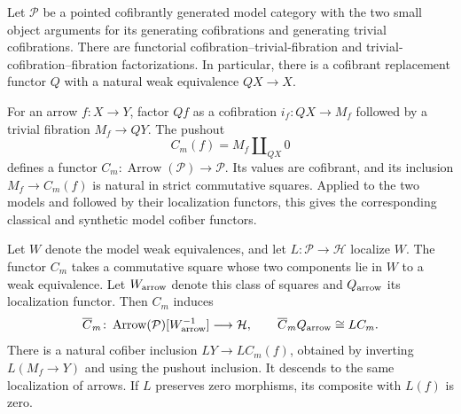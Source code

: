 \begin{theorem}
\label{sem:AdamsSynthetic:model-cofiber}
\label{sem:AdamsSynthetic:derived-model-cofiber}
Let $\mathcal P$ be a pointed cofibrantly generated model category with
the two small object arguments for its generating cofibrations and
generating trivial cofibrations. There are functorial
cofibration--trivial-fibration and trivial-cofibration--fibration
factorizations. In particular, there is a cofibrant replacement functor
$Q$ with a natural weak equivalence $QX\to X$.

For an arrow $f\colon X\to Y$, factor $Qf$ as a cofibration
$i_f\colon QX\to M_f$ followed by a trivial fibration $M_f\to QY$.
The pushout
\[
 C_m(f)=M_f\amalg_{QX}0
\]
defines a functor $C_m\colon\operatorname{Arrow}(\mathcal P)\to\mathcal P$.
Its values are cofibrant, and its inclusion $M_f\to C_m(f)$ is natural
in strict commutative squares. Applied to the two models and
followed by their localization functors, this gives the corresponding
classical and synthetic model cofiber functors.

Let $W$ denote the model weak equivalences, and let
$L\colon\mathcal P\to\mathcal H$ localize $W$.
The functor $C_m$ takes a commutative square whose two components lie
in $W$ to a weak equivalence. Let $W_{\rm arrow}$ denote this class of
squares and $Q_{\rm arrow}$ its localization functor. Then $C_m$ induces
\[
 \overline C_m\colon
 \operatorname{Arrow}(\mathcal P)[W_{\rm arrow}^{-1}]
 \longrightarrow\mathcal H,
 \qquad \overline C_m Q_{\rm arrow}\cong LC_m.
\]
There is a natural cofiber inclusion $LY\to LC_m(f)$, obtained by
inverting $L(M_f\to Y)$ and using the pushout inclusion. It descends
to the same localization of arrows. If $L$ preserves zero morphisms,
its composite with $L(f)$ is zero.
\end{theorem}

